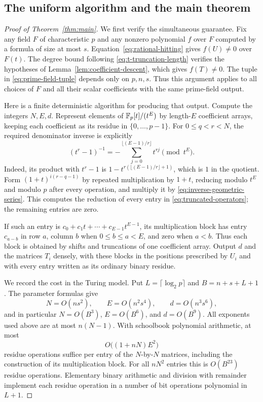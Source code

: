 \subsection{The uniform algorithm and the main theorem}

\begin{proof}[Proof of Theorem~\ref{thm:main}]
 We first verify the simultaneous guarantee.  Fix any field $F$ of
 characteristic $p$ and any nonzero polynomial $f$ over $F$ computed by a
 formula of size at most $s$.
 Equation~\eqref{eq:rational-hitting} gives $f(U)\ne0$ over $F(t)$.
 The degree bound following \eqref{eq:t-truncation-length} verifies the
 hypotheses of Lemma~\ref{lem:coefficient-descent}, which gives $f(T)\ne0$.
 The tuple in \eqref{eq:prime-field-tuple} depends only on $p,n,s$.  Thus this
 argument applies to all choices of $F$ and all their scalar coefficients
 with the same prime-field output.

 Here is a finite deterministic algorithm for producing that output.
 Compute the integers $N,E,d$.  Represent elements of $\mathbb F_p[t]/(t^E)$ by
 length-$E$ coefficient arrays, keeping each coefficient as its residue in
 $\{0,\ldots,p-1\}$.  For $0\leq q<r<N$, the required denominator inverse
 is explicitly
 \begin{equation}\label{eq:inverse-geometric-series}
  (t^r-1)^{-1}
    =-\sum_{j=0}^{\lfloor(E-1)/r\rfloor}t^{rj}
    \pmod {t^E}.
 \end{equation}
 Indeed, its product with $t^r-1$ is $1-t^{r(\lfloor(E-1)/r\rfloor+1)}$,
 which is $1$ in the quotient.  Form $(1+t)^{i(r-q-1)}$ by repeated
 multiplication by $1+t$, reducing modulo $t^E$ and modulo $p$ after every
 operation, and multiply it by \eqref{eq:inverse-geometric-series}.
 This computes the reduction of every entry in
 \eqref{eq:truncated-operators}; the remaining entries are zero.

 If such an entry is $c_0+c_1t+\cdots+c_{E-1}t^{E-1}$, its multiplication
 block has entry $c_{a-b}$ in row $a$, column $b$ when
 $0\leq b\leq a<E$, and zero when $a<b$.  Thus each block is obtained by
 shifts and truncations of one coefficient array.  Output $d$ and the
 matrices $T_i$ densely, with these blocks in the positions prescribed by
 $U_i$ and with every entry written as its ordinary binary residue.

 We record the cost in the Turing model.  Put
 $L=\lceil\log_2p\rceil$ and $B=n+s+L+1$.  The parameter formulas give
 \[
  N=O(ns^2),\qquad E=O(n^2s^4),\qquad d=O(n^3s^6),
 \]
 and in particular $N=O(B^3)$, $E=O(B^6)$, and $d=O(B^9)$.
 All exponents used above are at most $n(N-1)$.  With schoolbook
 polynomial arithmetic, at most
 \[
  O\bigl((1+nN)E^2\bigr)
 \]
 residue operations suffice per entry of the $N$-by-$N$ matrices,
 including the construction of its multiplication block.  For all
 $nN^2$ entries this is $O(B^{23})$ residue operations.  Elementary binary
 arithmetic and division with remainder implement each residue operation
 in a number of bit operations polynomial in $L+1$.


\end{proof}
